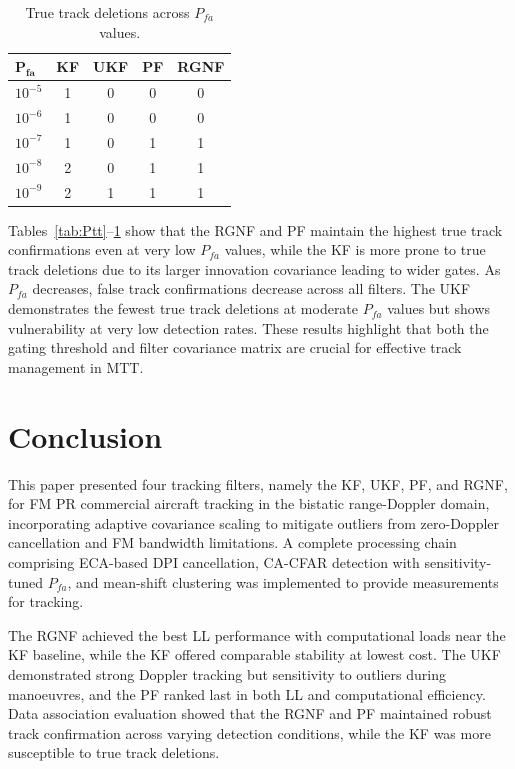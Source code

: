 \documentclass[conference]{IEEEtran}
\begin{document}
\begin{table}[H]
    \centering
    \caption{True track deletions across $P_{fa}$ values.}
    \label{tab:Pttd}
    \setlength{\tabcolsep}{3.5pt}
    \begin{tabular}{@{}lcccc@{}}
        \toprule
        $\mathbf{P_{fa}}$ & \textbf{KF} & \textbf{UKF} & \textbf{PF} & \textbf{RGNF} \\
        \midrule
        $10^{-5}$ & 1 & \cellcolor{green!20}0 & \cellcolor{green!20}0 & \cellcolor{green!20}0 \\
        $10^{-6}$ & 1 & \cellcolor{green!20}0 & \cellcolor{green!20}0 & \cellcolor{green!20}0 \\
        $10^{-7}$ & 1 & \cellcolor{green!20}0 & 1 & 1 \\
        $10^{-8}$ & \cellcolor{red!20}2 & \cellcolor{green!20}0 & 1 & 1 \\
        $10^{-9}$ & \cellcolor{red!20}2 & 1 & 1 & 1 \\
        \bottomrule
    \end{tabular}
\end{table}

Tables~\ref{tab:Ptt}--\ref{tab:Pttd} show that the RGNF and PF maintain the highest true track confirmations even at very low $P_{fa}$ values, while the KF is more prone to true track deletions due to its larger innovation covariance leading to wider gates. As $P_{fa}$ decreases, false track confirmations decrease across all filters. The UKF demonstrates the fewest true track deletions at moderate $P_{fa}$ values but shows vulnerability at very low detection rates. These results highlight that both the gating threshold and filter covariance matrix are crucial for effective track management in MTT.

\section{Conclusion}

This paper presented four tracking filters, namely the KF, UKF, PF, and RGNF, for FM PR commercial aircraft tracking in the bistatic range-Doppler domain, incorporating adaptive covariance scaling to mitigate outliers from zero-Doppler cancellation and FM bandwidth limitations. A complete processing chain comprising ECA-based DPI cancellation, CA-CFAR detection with sensitivity-tuned $P_{fa}$, and mean-shift clustering was implemented to provide measurements for tracking.

The RGNF achieved the best LL performance with computational loads near the KF baseline, while the KF offered comparable stability at lowest cost. The UKF demonstrated strong Doppler tracking but sensitivity to outliers during manoeuvres, and the PF ranked last in both LL and computational efficiency. Data association evaluation showed that the RGNF and PF maintained robust track confirmation across varying detection conditions, while the KF was more susceptible to true track deletions.
\end{document}
